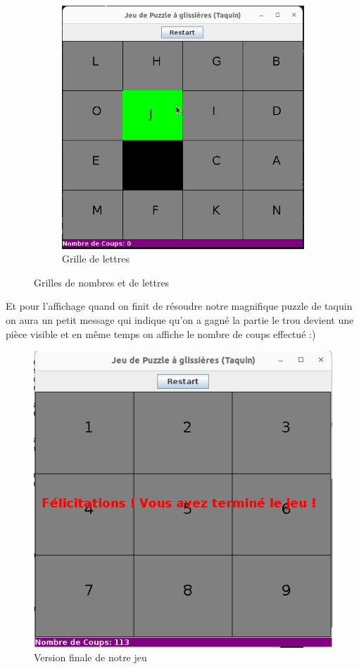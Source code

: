 \documentclass[a4paper,10pt]{article}
\begin{document}
\begin{figure}[H]
\begin{subfigure}{0.45\textwidth}
  \includegraphics[width=\linewidth]{captures/lettres.png}
  \caption{Grille de lettres}
\end{subfigure}
\caption{Grilles de nombres et de lettres}
\end{figure}

\vspace{2cm}

Et pour l'affichage quand on finit de résoudre notre magnifique puzzle de taquin on aura un petit message qui indique qu'on a gagné la partie le trou devient une pièce visible et en même temps on affiche le nombre de coups effectué :)


\begin{figure}[H]
\centering
\includegraphics[scale=0.6]{captures/VersionFinal.png}
\caption{Version finale de notre jeu}
\end{figure}
\end{document}

